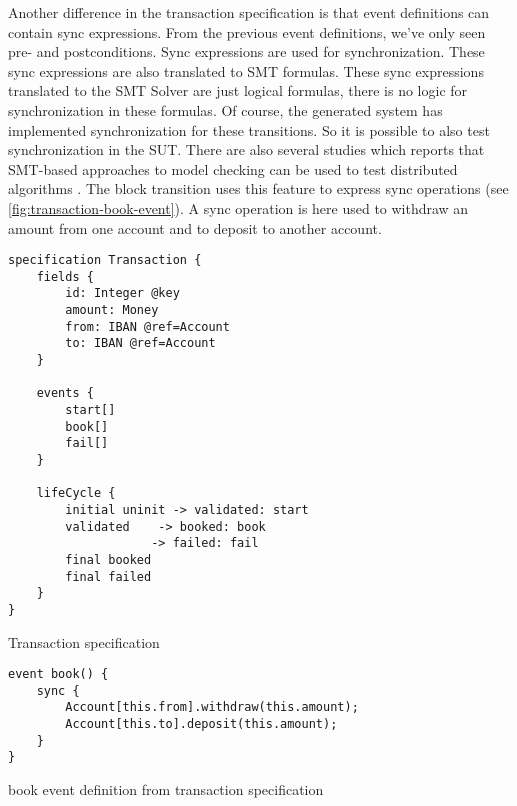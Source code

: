 Another difference in the transaction specification is that event definitions can contain sync expressions. From the previous event definitions, we've only seen pre- and postconditions. Sync expressions are used for synchronization. These sync expressions are also translated to SMT formulas. These sync expressions translated to the SMT Solver are just logical formulas, there is no logic for synchronization in these formulas. Of course, the generated system has implemented synchronization for these transitions. So it is possible to also test synchronization in the SUT. There are also several studies which reports that SMT-based approaches to model checking can be used to test distributed algorithms \cite{konnov2015you,alberti2015smt}.
The block transition uses this feature to express sync operations (see \autoref{fig:transaction-book-event}). A sync operation is here used to withdraw an amount from one account and to deposit to another account.


\begin{sourcecode}[h!]
\begin{lstlisting}[]
specification Transaction {
	fields {
		id: Integer @key
		amount: Money 
		from: IBAN @ref=Account
		to: IBAN @ref=Account
	}
	    
	events {   
		start[]  
		book[]  
		fail[]  
	}
	
	lifeCycle {
		initial uninit -> validated: start 
		validated    -> booked: book 
					-> failed: fail
		final booked 
		final failed
	}	
}
\end{lstlisting}
\caption{Transaction specification}
\label{fig:transaction-spec}
\end{sourcecode}

\begin{sourcecode}[h!]
\begin{lstlisting}[]
event book() {
	sync { 
		Account[this.from].withdraw(this.amount);
		Account[this.to].deposit(this.amount);  
	}
}
\end{lstlisting}
\caption{book event definition from transaction specification}
\label{fig:transaction-book-event}
\end{sourcecode}

